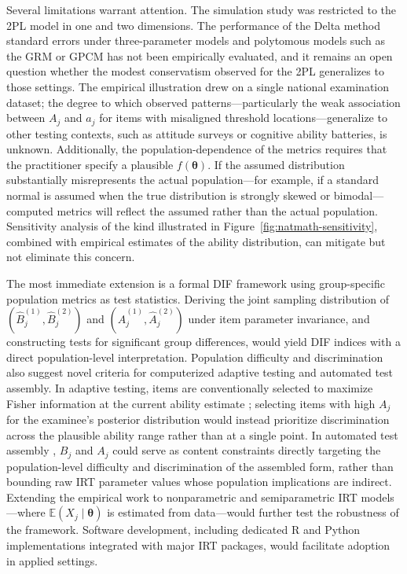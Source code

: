 \documentclass[man, 12pt, floatsintext]{apa7}
\begin{document}
Several limitations warrant attention. The simulation study was restricted to the 2PL model in one and two dimensions. The performance of the Delta method standard errors under three-parameter models and polytomous models such as the GRM or GPCM has not been empirically evaluated, and it remains an open question whether the modest conservatism observed for the 2PL generalizes to those settings. The empirical illustration drew on a single national examination dataset; the degree to which observed patterns---particularly the weak association between $A_j$ and $a_j$ for items with misaligned threshold locations---generalize to other testing contexts, such as attitude surveys or cognitive ability batteries, is unknown. Additionally, the population-dependence of the metrics requires that the practitioner specify a plausible $f(\boldsymbol{\theta})$. If the assumed distribution substantially misrepresents the actual population---for example, if a standard normal is assumed when the true distribution is strongly skewed or bimodal---computed metrics will reflect the assumed rather than the actual population. Sensitivity analysis of the kind illustrated in Figure~\ref{fig:natmath-sensitivity}, combined with empirical estimates of the ability distribution, can mitigate but not eliminate this concern.

The most immediate extension is a formal DIF framework using group-specific population metrics as test statistics. Deriving the joint sampling distribution of $(\hat{B}_j^{(1)}, \hat{B}_j^{(2)})$ and $(\hat{A}_j^{(1)}, \hat{A}_j^{(2)})$ under item parameter invariance, and constructing tests for significant group differences, would yield DIF indices with a direct population-level interpretation. Population difficulty and discrimination also suggest novel criteria for computerized adaptive testing and automated test assembly. In adaptive testing, items are conventionally selected to maximize Fisher information at the current ability estimate \parencite{Linden2000}; selecting items with high $A_j$ for the examinee's posterior distribution would instead prioritize discrimination across the plausible ability range rather than at a single point. In automated test assembly \parencite{VanderLinden2005}, $B_j$ and $A_j$ could serve as content constraints directly targeting the population-level difficulty and discrimination of the assembled form, rather than bounding raw IRT parameter values whose population implications are indirect. Extending the empirical work to nonparametric and semiparametric IRT models---where $\mathbb{E}(X_j \mid \boldsymbol{\theta})$ is estimated from data---would further test the robustness of the framework. Software development, including dedicated R and Python implementations integrated with major IRT packages, would facilitate adoption in applied settings.
\end{document}
